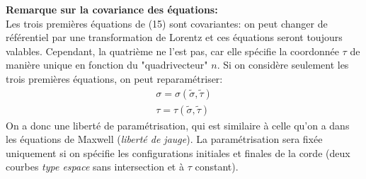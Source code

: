 \documentclass[a4paper,12pt]{article}
\begin{document}
\textbf{Remarque sur la covariance des équations:}\\
Les trois premières équations de (15) sont covariantes: on peut changer de référentiel par une transformation de Lorentz et ces équations seront toujours valables. Cependant, la quatrième ne l'est pas, car elle spécifie la coordonnée $\tau$ de manière unique en fonction du "quadrivecteur" $n$. 
Si on considère seulement les trois premières équations, on peut reparamétriser:
\begin{align}
\sigma=\sigma(\tilde{\sigma},\tilde{\tau})\\
\tau=\tau(\tilde{\sigma},\tilde{\tau})
\end{align}
On a donc une liberté de paramétrisation, qui est similaire à celle qu'on a dans les équations de Maxwell (\textit{liberté de jauge}). La paramétrisation sera fixée uniquement si on spécifie les configurations initiales et finales de la corde (deux courbes \textit{type espace} sans intersection et à $\tau$ constant).
\end{document}
